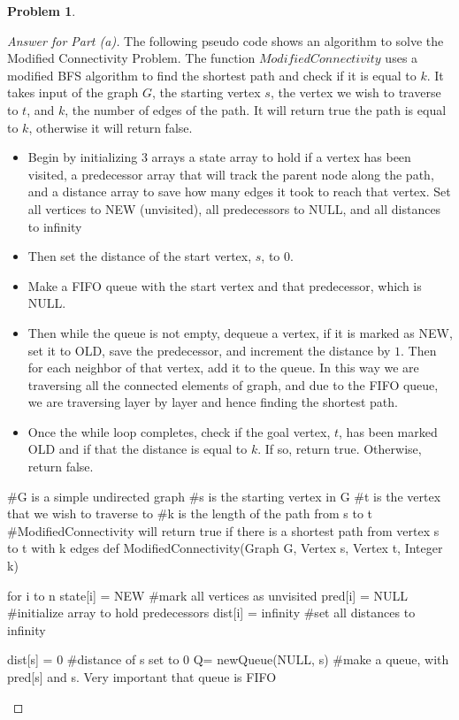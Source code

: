 \documentclass[11pt]{article}
\theoremstyle{definition}
\theoremstyle{definition}
\newtheorem{required}{Problem}
\theoremstyle{definition}
\begin{document}
\begin{required}
\begin{enumerate}[label=(\alph*)]
\begin{proof}[Answer for Part (a)]
The following pseudo code shows an algorithm to solve the Modified Connectivity Problem. The function $ModifiedConnectivity$ uses a modified BFS algorithm to find the shortest path and check if it is equal to $k$. It takes input of the graph $G$, the starting vertex $s$, the vertex we wish to traverse to $t$, and $k$, the number of edges of the path. It will return true the path is equal to $k$, otherwise it will return false. 
\begin{itemize}
\item Begin by initializing 3 arrays a state array to hold if a vertex has been visited, a predecessor array that will track the parent node along the path, and a distance array to save how many edges it took to reach that vertex. Set all vertices to NEW (unvisited), all predecessors to NULL, and all distances to infinity  
\item Then set the distance of the start vertex, $s$, to 0. 
\item Make a FIFO queue with the start vertex and that predecessor, which is NULL. 
\item Then while the queue is not empty, dequeue a vertex, if it is marked as NEW, set it to OLD, save the predecessor, and increment the distance by $1$. Then for each neighbor of that vertex, add it to the queue. In this way we are traversing all the connected elements of graph, and due to the FIFO queue, we are traversing layer by layer and hence finding the shortest path. 
\item Once the while loop completes, check if the goal vertex, $t$, has been marked OLD and if that the distance is equal to $k$. If so, return true. Otherwise, return false.  \\
\end{itemize}
\begin{python}

#G is a simple undirected graph
#s is the starting vertex in G
#t is the vertex that we wish to traverse to
#k is the length of the path from s to t
#ModifiedConnectivity will return true if there is a shortest path from vertex s to t with k edges
def ModifiedConnectivity(Graph G, Vertex s, Vertex t, Integer k) {
	for i to n {
		state[i] = NEW 	#mark all vertices as unvisited
		pred[i] = NULL		#initialize array to hold predecessors 
		dist[i] = infinity 	#set all distances to infinity
	}

	dist[s] = 0 	#distance of s set to 0
	Q= newQueue(NULL, s) 	  #make a queue, with pred[s] and s. Very important that queue is FIFO 

}
\end{python}
\end{proof}
\end{enumerate}
\end{required}
\end{document}
